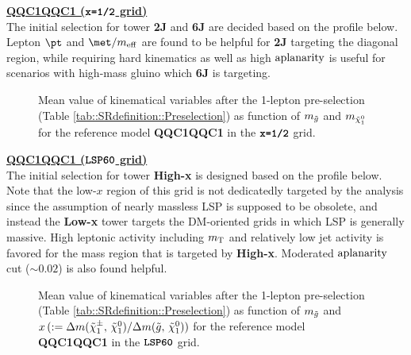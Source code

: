 \noindent \underline{\textbf{QQC1QQC1 ($\mathrm{\textbf{\texttt{x=1/2}}}$ grid)}} \\
The initial selection for tower \textbf{2J} and \textbf{6J} are decided based on the profile below.
Lepton $\pt$ and $\met/\meffInc$ are found to be helpful for \textbf{2J} targeting the diagonal region,
while requiring hard kinematics as well as high $\mathrm{aplanarity}$ is useful for scenarios with high-mass gluino which \textbf{6J} is targeting. 
%
\begin{figure}[h]
  \centering
    \caption{ 
      Mean value of kinematical variables after the 1-lepton pre-selection (Table \ref{tab::SRdefinition::Preselection}) as function of $m_{\tilde{g}}$ and $m_{\tilde{\chi}_{1}^{0}}$ for the reference model \textbf{QQC1QQC1} in the $\mathrm{\textbf{\texttt{x=1/2}}}$ grid.
    }
    \label{fig::SRdefinition::kineMap_QQC1QQC1_x12} 
\end{figure}
 
\clearpage
\noindent \underline{\textbf{QQC1QQC1 ($\mathrm{\textbf{\texttt{LSP60}}}$ grid)}} \\
The initial selection for tower \textbf{High-x} is designed based on the profile below.
Note that the low-$x$ region of this grid is not dedicatedly targeted by the analysis since the assumption of nearly massless LSP is supposed to be obsolete, and instead the \textbf{Low-x} tower targets the DM-oriented grids in which LSP is generally massive.
High leptonic activity including $m_{\mathrm{T}}$ and relatively low jet activity is favored for the mass region that is targeted by \textbf{High-x}. Moderated $\mathrm{aplanarity}$ cut ($\sim 0.02$) is also found helpful.
%
\begin{figure}[h]
  \centering
    \caption{
      Mean value of kinematical variables after the 1-lepton pre-selection (Table \ref{tab::SRdefinition::Preselection}) as function of $m_{\tilde{g}}$ and $x \, (:= \Delta m(\tilde{\chi}_{1}^{\pm}, \, \tilde{\chi}_{1}^{0})/\Delta m(\tilde{g}, \, \tilde{\chi}_{1}^{0}))$ for the reference model \textbf{QQC1QQC1} in the $\mathrm{\textbf{\texttt{LSP60}}}$ grid.
    }
    \label{fig::SRdefinition::kineMap_QQC1QQC1_varx} 
\end{figure}

